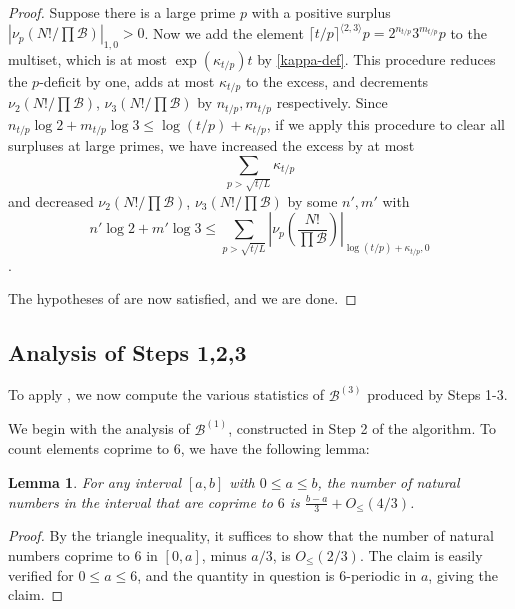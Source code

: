 \documentclass[12pt,a4paper,reqno]{amsart}
\numberwithin{equation}{section}
\theoremstyle{plain}
\newtheorem{lemma}[theorem]{Lemma}
\theoremstyle{definition}
\newcommand\tuple{{\mathcal B}}
\begin{document}
\begin{proof} Suppose there is a large prime $p$ with a positive surplus
$|\nu_p(N!/\prod \tuple)|_{1,0} > 0$.  Now we add the element $\lceil t/p \rceil^{\langle 2,3 \rangle} p = 2^{n_{t/p}} 3^{m_{t/p}} p$ to the multiset, which is at most $\exp(\kappa_{t/p}) t$ by \eqref{kappa-def}.  This procedure reduces the $p$-deficit by one, adds at most $\kappa_{t/p}$ to the excess, and decrements $\nu_2(N!/\prod \tuple)$, $\nu_3(N!/\prod \tuple)$ by $n_{t/p}, m_{t/p}$ respectively.  Since $n_{t/p} \log 2 + m_{t/p} \log 3 \leq \log(t/p) + \kappa_{t/p}$, if we apply this procedure to clear all surpluses at large primes, we have increased the excess by at most
$$ \sum_{p > \sqrt{t/L}} \kappa_{t/p}$$
and decreased $\nu_2(N!/\prod \tuple)$, $\nu_3(N!/\prod \tuple)$ by some $n',m'$ with 
$$n' \log 2 + m' \log 3 \leq \sum_{p>\sqrt{t/L}} \left|\nu_p\left(\frac{N!}{\prod \tuple}\right)\right|_{\log(t/p)+\kappa_{t/p},0}$$.  

The hypotheses of  are now satisfied, and we are done.
\end{proof}


\subsection{Analysis of Steps 1,2,3}

To apply 
, we now compute the various statistics of ${\mathcal B}^{(3)}$ produced by Steps 1-3.

We begin with the analysis of $\tuple^{(1)}$, constructed in Step 2 of the algorithm.  To count elements coprime to $6$, we have the following lemma:

\begin{lemma}\label{lit}  For any interval $[a,b]$ with $0 \leq a \leq b$, the number of natural numbers in the interval that are coprime to $6$ is $\frac{b-a}{3} + O_{\leq}(4/3)$.
\end{lemma}

\begin{proof}  By the triangle inequality, it suffices to show that the number of natural numbers coprime to $6$ in $[0,a]$, minus $a/3$, is $O_{\leq}(2/3)$.  The claim is easily verified for $0 \leq a \leq 6$, and the quantity in question is $6$-periodic in $a$, giving the claim.
\end{proof}
\end{document}
